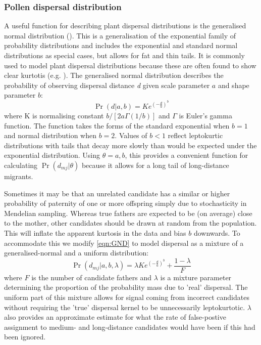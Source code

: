 \documentclass[10pt, a4paper, twocolumn]{article} %
\begin{document}
\subsubsection{Pollen dispersal distribution}

A useful function for describing plant dispersal distributions is the generalised normal distribution (\cite{clark1998trees,Nadarajah2005,kremer2012long}). This is a generalisation of the exponential family of probability distributions and includes the exponential and standard normal distributions as special cases, but allows for fat and thin tails. It is commonly used to model plant dispersal distributions because these are often found to show clear kurtotis (e.g. \cite{austerlitz2004using, robledo2005patterns, klein2008pollen, burczyk2019patterns, field2011importance, ottewell2012pollen}). The generalised normal distribution describes the probability of observing dispersal distance \textit{d} given scale parameter $a$ and shape parameter $b$:
\begin{equation}
\Pr(d|a,b) =K e^{  (-\frac{d}{a} )^b }
\label{eqn:GND}
\end{equation}
where K is normalising constant $b/[2a\Gamma(1/b)]$ and $\Gamma$ is Euler's gamma function. The function takes the forms of the standard exponential when $b=1$ and normal distribution when $b=2$. Values of $b<1$ reflect leptokurtic distributions with tails that decay more slowly than would be expected under the exponential distribution. Using $\theta={a,b}$, this provides a convenient function for calculating $\Pr(d_{mj} | \theta)$ because it allows for a long tail of long-distance migrants.

Sometimes it may be that an unrelated candidate has a similar or higher probability of paternity of one or more offspring simply due to stochasticity in Mendelian sampling.
Whereas true fathers are expected to be (on average) close to the mother, other candidates should be drawn at random from the population. This will inflate the apparent kurtosis in the data and bias $b$ downwards.
To accommodate this we modify \ref{eqn:GND} to model dispersal as a mixture of a generalised-normal and a uniform distribution:
\begin{equation}\label{eqn:mixture_model}
\Pr(d_{mj} | a,b,\lambda) = \lambda K e^{  (-\frac{d}{a} )^b } + \frac{1-\lambda}{F}
\end{equation}
where $F$ is the number of candidate fathers and $\lambda$ is a mixture parameter determining the proportion of the probability mass due to ’real’ dispersal.
The uniform part of this mixture allows for signal coming from incorrect candidates without requiring the 'true' dispersal kernel to be unnecessarily leptokurtotic.
$\lambda$ also provides an approximate estimate for what the rate of false-postive assignment to medium- and long-distance candidates would have been if this had been ignored.
\end{document}
